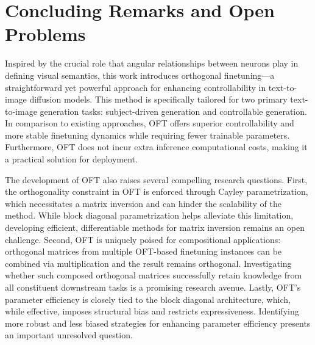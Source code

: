 \section{Concluding Remarks and Open Problems}

Inspired by the crucial role that angular relationships between neurons play in defining visual semantics, this work introduces orthogonal finetuning—a straightforward yet powerful approach for enhancing controllability in text-to-image diffusion models. This method is specifically tailored for two primary text-to-image generation tasks: subject-driven generation and controllable generation. In comparison to existing approaches, OFT offers superior controllability and more stable finetuning dynamics while requiring fewer trainable parameters. Furthermore, OFT does not incur extra inference computational costs, making it a practical solution for deployment.

The development of OFT also raises several compelling research questions. First, the orthogonality constraint in OFT is enforced through Cayley parametrization, which necessitates a matrix inversion and can hinder the scalability of the method. While block diagonal parametrization helps alleviate this limitation, developing efficient, differentiable methods for matrix inversion remains an open challenge. Second, OFT is uniquely poised for compositional applications: orthogonal matrices from multiple OFT-based finetuning instances can be combined via multiplication and the result remains orthogonal. Investigating whether such composed orthogonal matrices successfully retain knowledge from all constituent downstream tasks is a promising research avenue. Lastly, OFT's parameter efficiency is closely tied to the block diagonal architecture, which, while effective, imposes structural bias and restricts expressiveness. Identifying more robust and less biased strategies for enhancing parameter efficiency presents an important unresolved question.